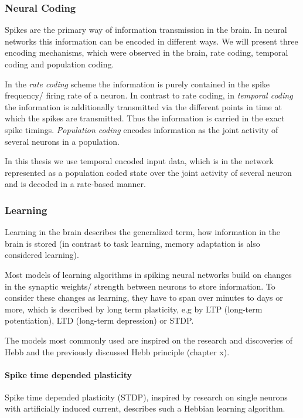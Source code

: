\subsubsection{Neural Coding}

Spikes are the primary way of information transmission in the brain.
In neural networks this information can be encoded in different ways.
We will present three encoding mechanisms, which were observed in the brain, rate coding, temporal coding and population coding.

In the \textit{rate coding} scheme the information is purely contained in the spike frequency/ firing rate of a neuron.
In contrast to rate coding, in \textit{temporal coding} the information is additionally transmitted via the different points in time at which the spikes are transmitted. 
Thus the information is carried in the exact spike timings.
\textit{Population coding} encodes information as the joint activity of several neurons in a population.  

In this thesis we use temporal encoded input data, which is in the network represented as a population coded state over the joint activity of several neuron and is decoded in a rate-based manner. 

\subsubsection{Learning}

Learning in the brain describes the generalized term, how information in the brain is stored (in contrast to task learning, memory adaptation is also considered learning).

Most models of learning algorithms in spiking neural networks build on changes in the synaptic weights/ strength between neurons to store information.
To consider these changes as learning, they have to span over minutes to days or more, which is described by long term plasticity, e.g by LTP (long-term potentiation), LTD (long-term depression) or STDP.
 
The models most commonly used are inspired on the research and discoveries of Hebb and the previously discussed Hebb principle (chapter x).

\paragraph{Spike time depended plasticity}

Spike time depended plasticity (STDP), inspired by research on single neurons with artificially induced current, describes such a Hebbian learning algorithm.

